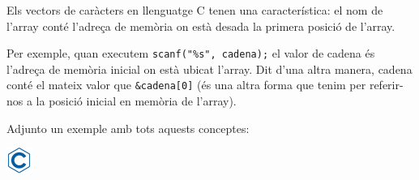 \documentclass[]{book}
\newenvironment{Shaded}{\begin{snugshade}}{\end{snugshade}}
\newcommand{\DataTypeTok}[1]{\textcolor[rgb]{0.13,0.29,0.53}{#1}}
\newcommand{\DecValTok}[1]{\textcolor[rgb]{0.00,0.00,0.81}{#1}}
\newcommand{\SpecialCharTok}[1]{\textcolor[rgb]{0.00,0.00,0.00}{#1}}
\newcommand{\StringTok}[1]{\textcolor[rgb]{0.31,0.60,0.02}{#1}}
\newcommand{\ImportTok}[1]{#1}
\newcommand{\ControlFlowTok}[1]{\textcolor[rgb]{0.13,0.29,0.53}{\textbf{#1}}}
\newcommand{\PreprocessorTok}[1]{\textcolor[rgb]{0.56,0.35,0.01}{\textit{#1}}}
\newcommand{\NormalTok}[1]{#1}
\begin{document}
Els vectors de caràcters en llenguatge C tenen una característica: el
nom de l'array conté l'adreça de memòria on està desada la primera
posició de l'array.

Per exemple, quan executem \texttt{scanf("\%s",\ cadena);} el valor de
cadena és l'adreça de memòria inicial on està ubicat l'array. Dit d'una
altra manera, cadena conté el mateix valor que \texttt{\&cadena{[}0{]}}
(és una altra forma que tenim per referir-nos a la posició inicial en
memòria de l'array).

Adjunto un exemple amb tots aquests conceptes:

\includegraphics{./img/c.png}

\begin{Shaded}
\end{Shaded}
\end{document}
